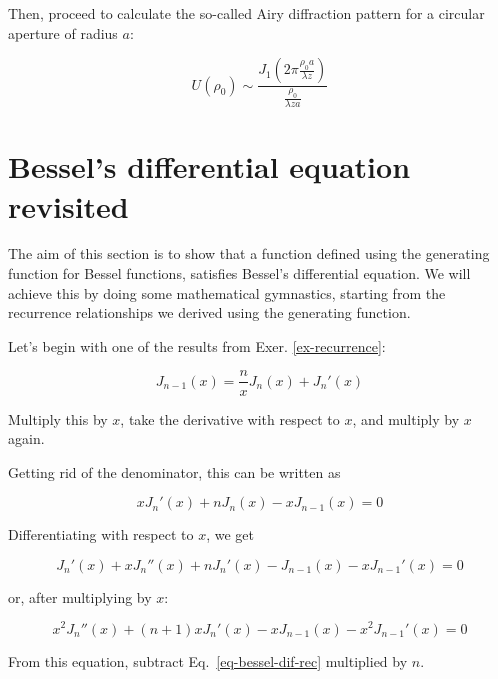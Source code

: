 \begin{exer}
Then, proceed to calculate the so-called Airy diffraction pattern for a circular aperture of radius $a$:

$$U(\rho_0) \sim \frac {J_1\left( 2 \pi \frac {\rho_0 a}{\lambda z} \right)}{\frac{\rho_0}{\lambda z a}}$$

\end{exer}


\section{Bessel's differential equation revisited}

The aim of this section is to show that a function defined using the generating function for Bessel functions, satisfies Bessel's differential equation. We will achieve this by doing some mathematical gymnastics, starting from the recurrence relationships we derived using the generating function.

Let's begin with one of the results from Exer. \ref{ex-recurrence}:

\begin{equation}
J_{n-1}(x) = \frac{n}{x}J_n(x) + J_n'(x)
\end{equation}

\begin{cue}
Multiply this by $x$, take the derivative with respect to $x$, and multiply by $x$ again.
\end{cue}

Getting rid of the denominator, this can be written as

\begin{equation}
x J_n'(x) + n J_n(x) - x J_{n-1}(x) = 0 \label{eq-bessel-dif-rec}
\end{equation} 

Differentiating with respect to $x$, we get

\begin{equation}
J_n'(x) + x J_n''(x) + n J_n'(x) - J_{n-1}(x) - x J_{n-1}'(x)= 0
\end{equation} 

or, after multiplying by $x$:

\begin{equation}
x^2 J_n''(x) + (n + 1) x J_n'(x) - x J_{n-1}(x) - x^2 J_{n-1}'(x)= 0
\end{equation} 

\begin{cue}
From this equation, subtract Eq.~\ref{eq-bessel-dif-rec} multiplied by $n$.
\end{cue}

